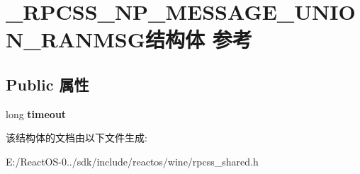 \hypertarget{struct___r_p_c_s_s___n_p___m_e_s_s_a_g_e___u_n_i_o_n___r_a_n_m_s_g}{}\section{\+\_\+\+R\+P\+C\+S\+S\+\_\+\+N\+P\+\_\+\+M\+E\+S\+S\+A\+G\+E\+\_\+\+U\+N\+I\+O\+N\+\_\+\+R\+A\+N\+M\+S\+G结构体 参考}
\label{struct___r_p_c_s_s___n_p___m_e_s_s_a_g_e___u_n_i_o_n___r_a_n_m_s_g}
\subsection*{Public 属性}
\begin{DoxyCompactItemize}
\item 
\mbox{\label{struct___r_p_c_s_s___n_p___m_e_s_s_a_g_e___u_n_i_o_n___r_a_n_m_s_g_af81f3908f5b74e6daba9831bb788e4f3}} 
long {\bfseries timeout}
\end{DoxyCompactItemize}


该结构体的文档由以下文件生成\+:\begin{DoxyCompactItemize}
\item 
E\+:/\+React\+O\+S-\/0../sdk/include/reactos/wine/rpcss\+\_\+shared.\+h\end{DoxyCompactItemize}
